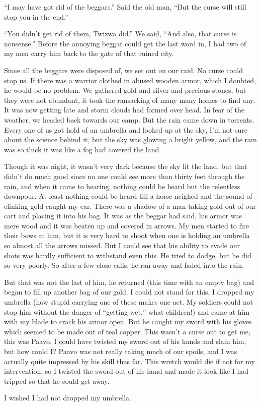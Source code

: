 ``I may have got rid of the beggars.'' Said the old man, ``But the curse will still stop you in the end.''

``You didn't get rid of them, Twi\-zwa did.'' We said, ``And also, that curse is nonsense.'' 
Before the annoying beggar could get the last word in, I had two of my men carry him back to the gate of that ruined city.

Since all the beggars were disposed of, we set out on our raid. No curse could stop us. If there was a warrior clothed in abused wooden armor, which I doubted, he would be no problem. We gathered gold and silver and precious stones, but they were not abundant, it took the ransacking of many many homes to find any. It was now getting late and storm clouds had formed over head. In fear of the weather, we headed back towards our camp. But the rain came down in torrents. Every one of us got hold of an umbrella and looked up at the sky, I'm not sure about the science behind it, but the sky was glowing a bright yellow, and the rain was so thick it was like a fog had covered the land.

Though it was night, it wasn't very dark because the sky lit the land, but that didn't do much good since no one could see more than thirty feet through the rain, and when it came to hearing, nothing could be heard but the relentless downpour. At least nothing could be heard till a horse neighed and the sound of clinking gold caught my ear. There was a shadow of a man taking gold out of our cart and placing it into his bag. It was as the beggar had said, his armor was mere wood and it was beaten up and covered in arrows. My men started to fire their bows at him, but it is very hard to shoot when one is holding an umbrella so almost all the arrows missed. But I could see that his ability to evade our shots was hardly sufficient to withstand even this. He tried to dodge, but he did so very poorly. So after a few close calls, he ran away and faded into the rain.

But that was not the last of him, he returned (this time with an empty bag) and began to fill up another bag of our gold. I could not stand for this, I dropped my umbrella (how stupid carrying one of these makes one act. My soldiers could not stop him without the danger of ``getting wet,'' what children!) and came at him with my blade to crack his armor open. But he caught my sword with his gloves which seemed to be made out of teal copper. This wasn't a curse out to get me, this was Paa\-vo. I could have twisted my sword out of his hands and slain him, but how could I? Paa\-vo was not really taking much of our spoils, and I was actually quite impressed by his skill thus far. This wretch would die if not for my intervention; so I twisted the sword out of his hand and made it look like I had tripped so that he could get away.

I wished I had not dropped my umbrella.
